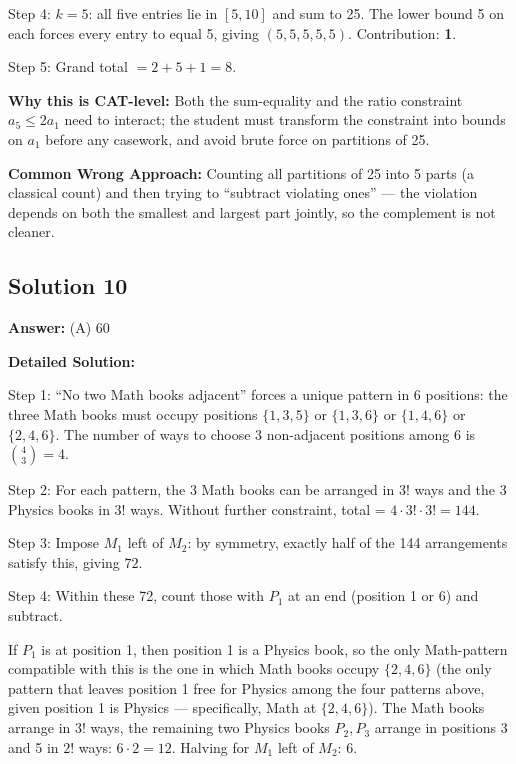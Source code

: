 \documentclass[11pt,a4paper]{article}
\begin{document}
Step 4: \(k = 5\): all five entries lie in \([5, 10]\) and sum to 25. The lower bound 5 on each forces every entry to equal 5, giving \((5, 5, 5, 5, 5)\). Contribution: \textbf{1}.

Step 5: Grand total \(= 2 + 5 + 1 = 8\).

\textbf{Why this is CAT-level:} Both the sum-equality and the ratio constraint \(a_5 \leq 2 a_1\) need to interact; the student must transform the constraint into bounds on \(a_1\) before any casework, and avoid brute force on partitions of 25.

\textbf{Common Wrong Approach:} Counting all partitions of 25 into 5 parts (a classical count) and then trying to ``subtract violating ones'' --- the violation depends on both the smallest and largest part jointly, so the complement is not cleaner.

\subsection*{Solution 10}
\textbf{Answer:} (A) 60

\textbf{Detailed Solution:}

Step 1: ``No two Math books adjacent'' forces a unique pattern in 6 positions: the three Math books must occupy positions \(\{1, 3, 5\}\) or \(\{1, 3, 6\}\) or \(\{1, 4, 6\}\) or \(\{2, 4, 6\}\). The number of ways to choose 3 non-adjacent positions among 6 is \(\binom{4}{3} = 4\).

Step 2: For each pattern, the 3 Math books can be arranged in \(3!\) ways and the 3 Physics books in \(3!\) ways. Without further constraint, total = \(4 \cdot 3! \cdot 3! = 144\).

Step 3: Impose \(M_1\) left of \(M_2\): by symmetry, exactly half of the 144 arrangements satisfy this, giving \(72\).

Step 4: Within these 72, count those with \(P_1\) at an end (position 1 or 6) and subtract.

If \(P_1\) is at position 1, then position 1 is a Physics book, so the only Math-pattern compatible with this is the one in which Math books occupy \(\{2, 4, 6\}\) (the only pattern that leaves position 1 free for Physics among the four patterns above, given position 1 is Physics --- specifically, Math at \(\{2,4,6\}\)). The Math books arrange in \(3!\) ways, the remaining two Physics books \(P_2, P_3\) arrange in positions 3 and 5 in \(2!\) ways: \(6 \cdot 2 = 12\). Halving for \(M_1\) left of \(M_2\): \(6\).
\end{document}
